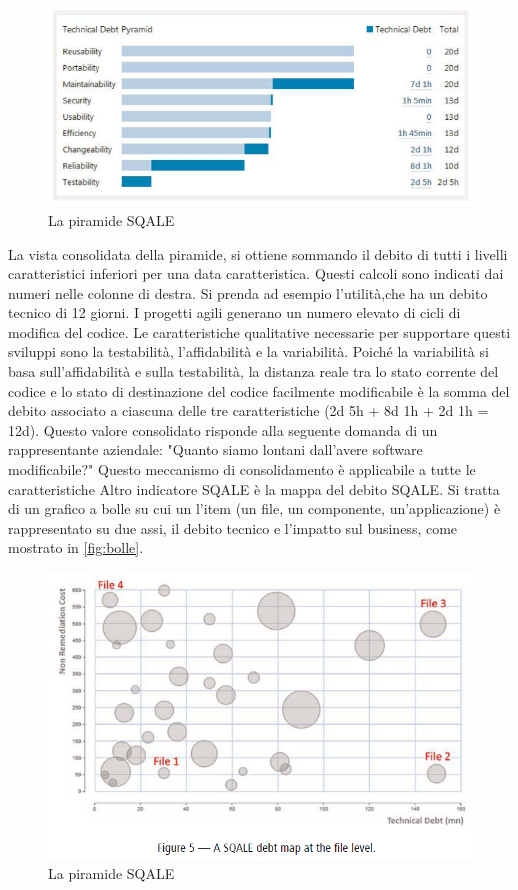 \begin{figure}[htbp]
	\centering
	\includegraphics[scale=0.5, trim = 0cm 0cm 0cm 0cm, clip=true]{figSonarCloud/piramide.PNG}
	\caption{La piramide SQALE}
	\label{fig:piramide}
\end{figure}
La vista consolidata della piramide, si ottiene sommando il debito di tutti i livelli caratteristici inferiori per una data caratteristica.
Questi calcoli sono indicati dai numeri nelle colonne di destra. Si prenda ad esempio l'utilità,che ha un debito tecnico di 12 giorni. I progetti agili generano un numero elevato di cicli di modifica del codice. Le caratteristiche qualitative necessarie per supportare questi sviluppi sono la testabilità, l'affidabilità e la variabilità.
Poiché la variabilità si basa sull'affidabilità e sulla testabilità, la distanza reale tra lo stato corrente del codice e lo stato di destinazione del codice facilmente modificabile è la somma del debito associato a ciascuna delle tre caratteristiche (2d 5h + 8d 1h + 2d 1h = 12d). Questo valore consolidato risponde alla seguente domanda di un rappresentante aziendale: "Quanto siamo lontani dall'avere software modificabile?" Questo meccanismo di consolidamento è applicabile a tutte le caratteristiche
Altro indicatore SQALE è la mappa del debito SQALE. Si tratta di un grafico a bolle su cui un l'item (un file, un componente, un'applicazione) è rappresentato su due assi, il debito tecnico e l'impatto sul business, come mostrato in \autoref{fig:bolle}. 
\begin{figure}[htbp]
	\centering
	\includegraphics[scale=0.5, trim = 0cm 0cm 0cm 0cm, clip=true]{figSonarCloud/bolle.PNG}
	\caption{La piramide SQALE}
	\label{fig:bolle}
\end{figure}